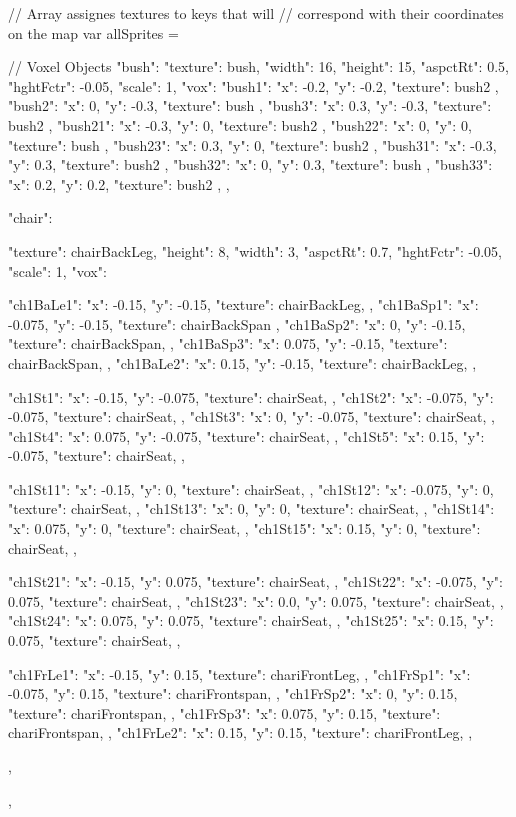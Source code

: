 // Array assignes textures to keys that will
// correspond with their coordinates on the map
var allSprites = {

  // Voxel Objects
  "bush": {
    "texture": bush,
    "width": 16,
    "height": 15,
    "aspctRt": 0.5,
    "hghtFctr": -0.05,
    "scale": 1,
    "vox": {
      "bush1":{ "x": -0.2, "y": -0.2, "texture": bush2 },
      "bush2":{ "x": 0, "y": -0.3, "texture": bush },
      "bush3":{ "x": 0.3, "y": -0.3, "texture": bush2 },
      "bush21":{ "x": -0.3, "y": 0, "texture": bush2 },
      "bush22":{ "x": 0, "y": 0, "texture": bush },
      "bush23":{ "x": 0.3, "y": 0, "texture": bush2 },
      "bush31":{ "x": -0.3, "y": 0.3, "texture": bush2 },
      "bush32":{ "x": 0, "y": 0.3, "texture": bush },
      "bush33":{ "x": 0.2, "y": 0.2, "texture": bush2 },
    }
  },  

  "chair": {
    "texture": chairBackLeg,
    "height": 8,
    "width": 3,
    "aspctRt": 0.7,
    "hghtFctr": -0.05,
    "scale": 1,
    "vox": {
      "ch1BaLe1":{ "x": -0.15, "y": -0.15, "texture": chairBackLeg, },
      "ch1BaSp1":{ "x": -0.075, "y": -0.15, "texture": chairBackSpan },
      "ch1BaSp2":{ "x": 0,    "y": -0.15, "texture": chairBackSpan, },
      "ch1BaSp3":{ "x": 0.075,  "y": -0.15, "texture": chairBackSpan, },
      "ch1BaLe2":{ "x": 0.15,  "y": -0.15, "texture": chairBackLeg, },
    
      "ch1St1":{ "x": -0.15,   "y": -0.075, "texture": chairSeat, },
      "ch1St2":{ "x": -0.075,   "y": -0.075, "texture": chairSeat, },
      "ch1St3":{ "x": 0,      "y": -0.075, "texture": chairSeat, },
      "ch1St4":{ "x": 0.075,    "y": -0.075, "texture": chairSeat, },
      "ch1St5":{ "x": 0.15,    "y": -0.075, "texture": chairSeat, },
    
      "ch1St11":{ "x": -0.15,  "y": 0, "texture": chairSeat, },
      "ch1St12":{ "x": -0.075,  "y": 0, "texture": chairSeat, },
      "ch1St13":{ "x": 0,     "y": 0, "texture": chairSeat, },
      "ch1St14":{ "x": 0.075,   "y": 0, "texture": chairSeat, },
      "ch1St15":{ "x": 0.15,   "y": 0, "texture": chairSeat, },

      "ch1St21":{ "x": -0.15,  "y": 0.075, "texture": chairSeat, },
      "ch1St22":{ "x": -0.075,  "y": 0.075, "texture": chairSeat, },
      "ch1St23":{ "x": 0.0,   "y": 0.075, "texture": chairSeat, },
      "ch1St24":{ "x": 0.075,   "y": 0.075, "texture": chairSeat, },
      "ch1St25":{ "x": 0.15,   "y": 0.075, "texture": chairSeat, },

      "ch1FrLe1":{ "x": -0.15, "y": 0.15, "texture": chariFrontLeg, },
      "ch1FrSp1":{ "x": -0.075, "y": 0.15, "texture": chariFrontspan, },
      "ch1FrSp2":{ "x": 0,    "y": 0.15, "texture": chariFrontspan, },
      "ch1FrSp3":{ "x": 0.075,  "y": 0.15, "texture": chariFrontspan, },
      "ch1FrLe2":{ "x": 0.15,  "y": 0.15, "texture": chariFrontLeg, },
    },
  },  

}
